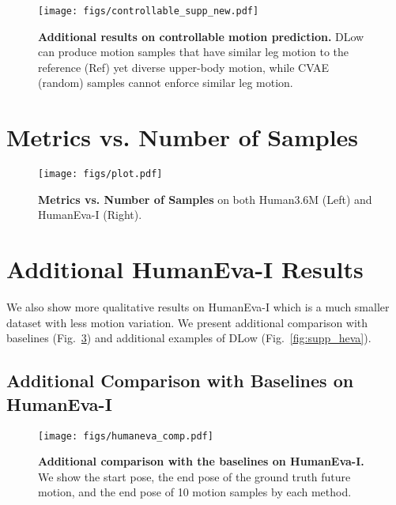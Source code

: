 \documentclass[runningheads]{llncs}
\begin{document}
\begin{figure}[ht!]
\vspace{-7mm}
    \centering
    \texttt{[image: figs/controllable\_supp\_new.pdf]}
    \vspace{-3mm}
    \caption{\textbf{Additional results on controllable motion prediction.} DLow can produce motion samples that have similar leg motion to the reference (Ref) yet diverse upper-body motion, while CVAE (random) samples cannot enforce similar leg motion.}
    \label{fig:control_supp}
    \vspace{-10mm}
\end{figure}

\clearpage
\section{Metrics vs. Number of Samples }
\label{sec:metrics_vs_k}
\begin{figure}[ht!]
    \vspace{-5mm}
    \centering
    \texttt{[image: figs/plot.pdf]}
    \caption{\textbf{Metrics vs. Number of Samples } on both Human3.6M (Left) and HumanEva-I (Right).}
    \label{fig:metrics}
    \vspace{-5mm}
\end{figure}



\clearpage
\section{Additional HumanEva-I Results}
We also show more qualitative results on HumanEva-I which is a much smaller dataset with less motion variation. We present additional comparison with baselines (Fig.~\ref{fig:supp_heva_comp}) and additional examples of DLow (Fig.~\ref{fig:supp_heva}).
\subsection{Additional Comparison with Baselines on HumanEva-I}
\begin{figure}[ht!]
    \vspace{-5mm}
    \centering
    \texttt{[image: figs/humaneva\_comp.pdf]}
    \vspace{-5mm}
    \caption{\textbf{Additional comparison with the baselines on HumanEva-I.} We show the start pose, the end pose of the ground truth future motion, and the end pose of 10 motion samples by each method.}
    \label{fig:supp_heva_comp}
    \vspace{-5mm}
\end{figure}
\end{document}
